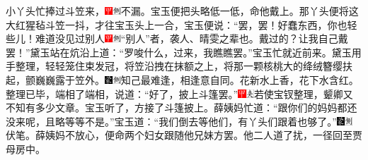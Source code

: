 小丫头忙捧过斗笠来，{\includegraphics[width=3mm]{../Images/00002}\includegraphics[width=3mm]{../Images/00011}\footnotesize \kaishu 不漏。}宝玉便把头略低一低，命他戴上。那丫头便将这大红猩毡斗笠一抖，才往宝玉头上一合，宝玉便说：``罢，罢！好蠢东西，你也轻些儿！难道没见过别人{\includegraphics[width=3mm]{../Images/00002}\includegraphics[width=3mm]{../Images/00011}\footnotesize \kaishu ``别人''者，袭人、晴雯之辈也。}戴过的？让我自己戴罢！''黛玉站在炕沿上道：``罗唆什么，过来，我瞧瞧罢。''宝玉忙就近前来。黛玉用手整理，轻轻笼住束发冠，将笠沿拽在抹额之上，将那一颗核桃大的绛绒簪缨扶起，颤巍巍露于笠外。{\includegraphics[width=3mm]{../Images/00006}\includegraphics[width=3mm]{../Images/00011}\footnotesize \kaishu 知己最难逢，相逢意自同。花新水上香，花下水含红。}整理已毕，端相了端相，说道：``好了，披上斗篷罢。''{\includegraphics[width=3mm]{../Images/00002}\includegraphics[width=3mm]{../Images/00012}\footnotesize \kaishu 若使宝钗整理，颦卿又不知有多少文章。}宝玉听了，方接了斗篷披上。薛姨妈忙道：``跟你们的妈妈都还没来呢，且略等等不是。''宝玉道：``我们倒去等他们，有丫头们跟着也够了。''{\includegraphics[width=3mm]{../Images/00006}\includegraphics[width=3mm]{../Images/00011}\footnotesize \kaishu 伏笔。}薛姨妈不放心，便命两个妇女跟随他兄妹方罢。他二人道了扰，一径回至贾母房中。

